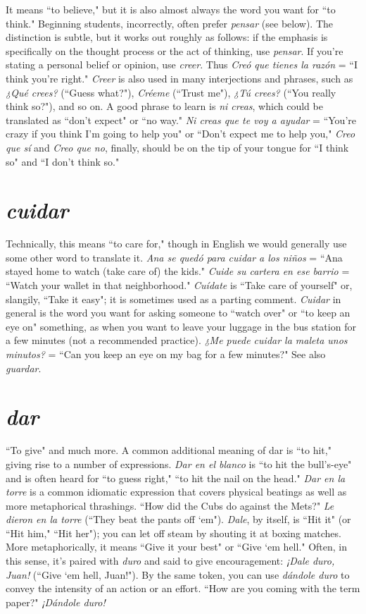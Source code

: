 It means ``to believe," but it is also almost always the word
you want for ``to think." Beginning students, incorrectly, often prefer
\emph{pensar} (see below). The distinction is subtle, but it works out roughly
as follows: if the emphasis is specifically on the thought process or the
act of thinking, use \emph{pensar}. If you're stating a personal belief or opinion, use \emph{creer}. Thus \emph{Creó que tienes la razón} = ``I think you're right."
\emph{Creer} is also used in many interjections and phrases, such as \emph{¿Qué
	crees?} (``Guess what?"), \emph{Créeme} (``Trust me"), \emph{¿Tú crees?} (``You really
think so?"), and so on. A good phrase to learn is \emph{ni creas}, which could
be translated as ``don't expect" or ``no way." \emph{Ni creas que te voy a ayudar} = ``You're crazy if you think I'm going to help you" or ``Don't expect me to help you," \emph{Creo que sí} and \emph{Creo que no}, finally, should be
on the tip of your tongue for ``I think so" and ``I don't think so."

\section{\emph{cuidar}}

Technically, this means ``to care for," though in English we
would generally use some other word to translate it. \emph{Ana se quedó
	para cuidar a los niños} = ``Ana stayed home to watch (take care of)
the kids." \emph{Cuide su cartera en ese barrio} = ``Watch your wallet in that
neighborhood." \emph{Cuídate} is ``Take care of yourself" or, slangily, ``Take it
easy"; it is sometimes used as a parting comment. \emph{Cuidar} in general is
the word you want for asking someone to ``watch over" or ``to keep an
eye on" something, as when you want to leave your luggage in the bus
station for a few minutes (not a recommended practice). \emph{¿Me puede
	cuidar la maleta unos minutos?} = ``Can you keep an eye on my bag
for a few minutes?" See also \emph{guardar}.

\section{\emph{dar}}

``To give" and much more. A common additional meaning of
dar is ``to hit," giving rise to a number of expressions. \emph{Dar en el blanco}
is ``to hit the bull's-eye" and is often heard for ``to guess right," ``to hit
the nail on the head." \emph{Dar en la torre} is a common idiomatic expression that covers physical beatings as well as more metaphorical thrashings. ``How did the Cubs do against the Mets?" \emph{Le dieron en la torre}
(``They beat the pants off `em"). \emph{Dale}, by itself, is ``Hit it" (or ``Hit
him," ``Hit her"); you can let off steam by shouting it at boxing matches.
More metaphorically, it means ``Give it your best" or ``Give `em hell."
Often, in this sense, it's paired with \emph{duro} and said to give encouragement: \emph{¡Dale duro, Juan!} (``Give `em hell, Juan!"). By the same token,
you can use \emph{dándole duro} to convey the intensity of an action or an
effort. ``How are you coming with the term paper?" \emph{¡Dándole duro!}


